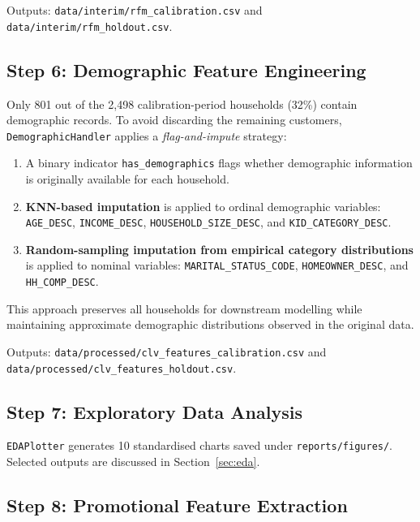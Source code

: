 \documentclass[conference]{IEEEtran}
\begin{document}
Outputs: \texttt{data/interim/rfm\_calibration.csv} and
\texttt{data/interim/rfm\_holdout.csv}.

\subsection{Step 6: Demographic Feature Engineering}

Only 801 out of the 2{,}498 calibration-period households (32\%)
contain demographic records. To avoid
discarding the remaining customers, 
\texttt{DemographicHandler} applies a
\emph{flag-and-impute} strategy:

\begin{enumerate}
  \item A binary indicator
        \texttt{has\_demographics} flags whether
        demographic information is originally available
        for each household.

  \item \textbf{KNN-based imputation} is applied to
        ordinal demographic variables:
        \texttt{AGE\_DESC},
        \texttt{INCOME\_DESC},
        \texttt{HOUSEHOLD\_SIZE\_DESC}, and
        \texttt{KID\_CATEGORY\_DESC}.

  \item \textbf{Random-sampling imputation from empirical
        category distributions} is applied to nominal
        variables:
        \texttt{MARITAL\_STATUS\_CODE},
        \texttt{HOMEOWNER\_DESC}, and
        \texttt{HH\_COMP\_DESC}.
\end{enumerate}

This approach preserves all households for downstream
modelling while maintaining approximate demographic
distributions observed in the original data.

Outputs:
\texttt{data/processed/clv\_features\_calibration.csv}
and
\texttt{data/processed/clv\_features\_holdout.csv}.

\subsection{Step 7: Exploratory Data Analysis}

\texttt{EDAPlotter} generates 10 standardised charts saved under
\texttt{reports/figures/}. Selected outputs are discussed in
Section~\ref{sec:eda}.

\subsection{Step 8: Promotional Feature Extraction}
\end{document}
